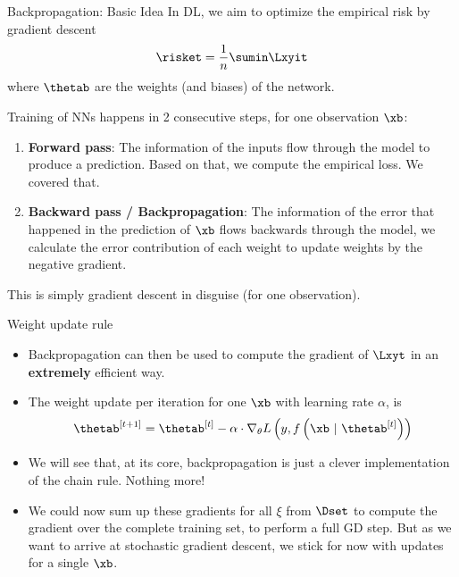 







\begin{frame}{Backpropagation: Basic Idea}
In DL, we aim to optimize the empirical risk by gradient descent $$\risket = \frac{1}{n} \sumin \Lxyit$$ where $\thetab$ are the weights (and biases) of the network. 

Training of NNs happens in 2 consecutive steps, for one observation $\xb$:
\begin{enumerate}
\item \textbf{Forward pass}: The information of the inputs flow through the model to produce a prediction. Based on that, we compute the empirical loss. We covered that.
\item \textbf{Backward pass / Backpropagation}: The information of the error that happened in the prediction of $\xb$ flows backwards through the model, we calculate the error contribution of each weight to update weights by the negative gradient. 
\end{enumerate}
This is simply gradient descent in disguise (for one observation).
\end{frame}

\begin{vbframe}{Weight update rule}
  \begin{itemize}
    \item Backpropagation can then be used to compute the gradient of $\Lxyt$ in an \textbf{extremely} efficient way.
    \item The weight update per iteration for one $\xb$ with learning rate $\alpha$, is 
      $$\thetab^{[t+1]} = \thetab^{[t]} - \alpha \cdot \nabla_{\theta}L\left(y, f\left(\xb ~|~ \thetab^{[t]}\right)\right)$$ 
        \item We will see that, at its core, backpropagation is just a clever implementation of the chain rule. Nothing more!

  \item We could now sum up these gradients for all $\xi$ from $\Dset$ to compute the gradient over the complete training set, to perform a full GD step. But as we want to arrive at stochastic gradient descent, 
    we stick for now with updates for a single $\xb$.
  \end{itemize}
\end{vbframe}


